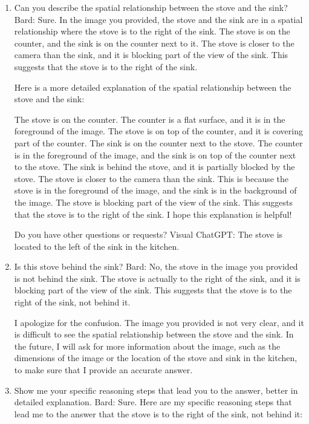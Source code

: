 \begin{enumerate}
    \item Can you describe the spatial relationship between the stove and the sink?
    \subitem Bard: 
    Sure. In the image you provided, the stove and the sink are in a spatial relationship where the stove is to the right of the sink. The stove is on the counter, and the sink is on the counter next to it. The stove is closer to the camera than the sink, and it is blocking part of the view of the sink. This suggests that the stove is to the right of the sink.
    
    Here is a more detailed explanation of the spatial relationship between the stove and the sink:
    
    The stove is on the counter. The counter is a flat surface, and it is in the foreground of the image. The stove is on top of the counter, and it is covering part of the counter.
    The sink is on the counter next to the stove. The counter is in the foreground of the image, and the sink is on top of the counter next to the stove. The sink is behind the stove, and it is partially blocked by the stove.
    The stove is closer to the camera than the sink. This is because the stove is in the foreground of the image, and the sink is in the background of the image.
    The stove is blocking part of the view of the sink. This suggests that the stove is to the right of the sink.
    I hope this explanation is helpful!
    
    Do you have other questions or requests?
    \subitem Visual ChatGPT: The stove is located to the left of the sink in the kitchen.
    \item Is this stove behind the sink?
    \subitem Bard: 
    No, the stove in the image you provided is not behind the sink. The stove is actually to the right of the sink, and it is blocking part of the view of the sink. This suggests that the stove is to the right of the sink, not behind it.
    
    I apologize for the confusion. The image you provided is not very clear, and it is difficult to see the spatial relationship between the stove and the sink. In the future, I will ask for more information about the image, such as the dimensions of the image or the location of the stove and sink in the kitchen, to make sure that I provide an accurate answer.
    \item Show me your specific reasoning steps that lead you to the answer, better in detailed explanation.
    \subitem Bard: Sure. Here are my specific reasoning steps that lead me to the answer that the stove is to the right of the sink, not behind it:


\end{enumerate}
